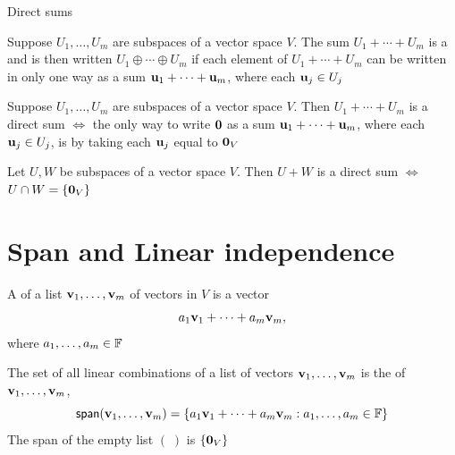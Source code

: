 \documentclass[aspectratio=169]{beamer}
\begin{document}
\begin{frame}{Direct sums}
\begin{definition}
Suppose $U_1,\ldots,U_m$ are subspaces of a vector space $V$.
The sum $U_1+\cdots+U_m$ is a  and is then written $U_1\oplus\cdots\oplus U_m$ if each element of $U_1+\cdots+U_m$ can be written in only one way as a sum $\mathbf{u}_1+\cdots+\mathbf{u}_m$, where each $\mathbf{u}_j\in U_j$
\end{definition}
\vfill
\begin{theorem}
Suppose $U_1,\ldots,U_m$ are subspaces of a vector space $V$. 
Then $U_1+\cdots+U_m$ is a direct sum $\iff$ the only way to write $\b0$ as a sum $\mathbf{u}_1+\cdots+\mathbf{u}_m$, where each $\mathbf{u}_j\in U_j$, is by taking each $\mathbf{u}_j$ equal to $\b0_V$
\end{theorem}
\vfill
\begin{importanttheorem}
Let $U,W$ be subspaces of a vector space $V$. Then $U+W$ is a direct sum $\iff$ $U\cap W=\{\b0_V\}$
\end{importanttheorem}
\end{frame}



\section{Span and Linear independence}

\begin{frame}
\begin{definition}
A  of a list $\mathbf{v}_1,\ldots,\mathbf{v}_m$ of vectors in $V$ is a vector
\[
a_1\mathbf{v}_1+\cdots+a_m\mathbf{v}_m,
\]
where $a_1,\ldots,a_m\in\mathbb{F}$
\end{definition}
\begin{definition}[Span]
The set of all linear combinations of a list of vectors $\mathbf{v}_1,\ldots,\mathbf{v}_m$ is the  of $\mathbf{v}_1,\ldots,\mathbf{v}_m$,
\[
\mathsf{span}(\mathbf{v}_1,\ldots,\mathbf{v}_m)=
\left\{
a_1\mathbf{v}_1+\cdots+a_m\mathbf{v}_m:a_1,\ldots,a_m\in\mathbb{F}
\right\}
\]
The span of the empty list $(\;)$ is $\{\b0_V\}$
\end{definition}
\end{frame}
\end{document}
